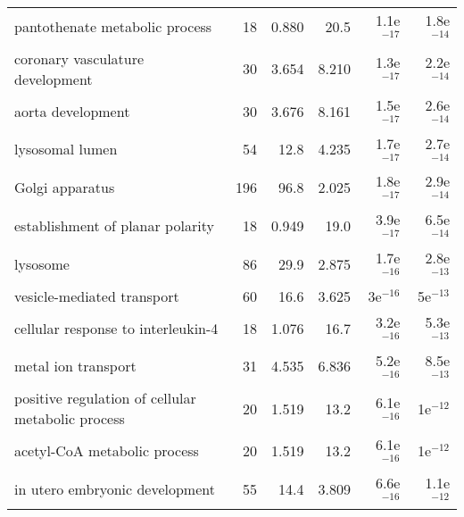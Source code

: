 \begin{longtable}{lrrrrr}
                    pantothenate metabolic process &                      18 &                   0.880 &       20.5 &         1.1e$^{-17}$ &         1.8e$^{-14}$ \\
                  coronary vasculature development &                      30 &                   3.654 &      8.210 &         1.3e$^{-17}$ &         2.2e$^{-14}$ \\
                                 aorta development &                      30 &                   3.676 &      8.161 &         1.5e$^{-17}$ &         2.6e$^{-14}$ \\
                                   lysosomal lumen &                      54 &                    12.8 &      4.235 &         1.7e$^{-17}$ &         2.7e$^{-14}$ \\
                                   Golgi apparatus &                     196 &                    96.8 &      2.025 &         1.8e$^{-17}$ &         2.9e$^{-14}$ \\
                  establishment of planar polarity &                      18 &                   0.949 &       19.0 &         3.9e$^{-17}$ &         6.5e$^{-14}$ \\
                                          lysosome &                      86 &                    29.9 &      2.875 &         1.7e$^{-16}$ &         2.8e$^{-13}$ \\
                        vesicle-mediated transport &                      60 &                    16.6 &      3.625 &           3e$^{-16}$ &           5e$^{-13}$ \\
                cellular response to interleukin-4 &                      18 &                   1.076 &       16.7 &         3.2e$^{-16}$ &         5.3e$^{-13}$ \\
                               metal ion transport &                      31 &                   4.535 &      6.836 &         5.2e$^{-16}$ &         8.5e$^{-13}$ \\
 positive regulation of cellular metabolic process &                      20 &                   1.519 &       13.2 &         6.1e$^{-16}$ &           1e$^{-12}$ \\
                      acetyl-CoA metabolic process &                      20 &                   1.519 &       13.2 &         6.1e$^{-16}$ &           1e$^{-12}$ \\
                    in utero embryonic development &                      55 &                    14.4 &      3.809 &         6.6e$^{-16}$ &         1.1e$^{-12}$ \\

\end{longtable}
